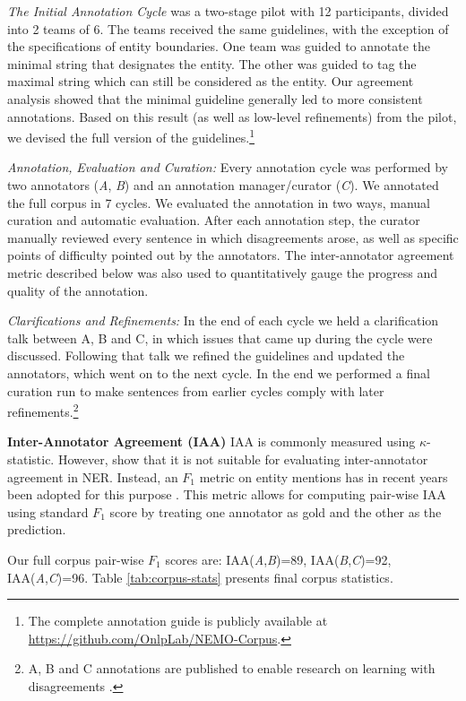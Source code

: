 \documentclass[11pt,a4paper]{article}
\begin{document}
{\em The Initial Annotation Cycle} was  a two-stage pilot with 12 participants, divided into 2 teams of 6. 
The teams received the same guidelines, with the exception of the specifications of entity boundaries. One team was guided to annotate the minimal string that designates the entity. The other was guided to tag the maximal string which can still be considered as the entity. Our agreement analysis showed that the minimal guideline generally led to more consistent annotations.
Based on this result (as well as low-level refinements) from the pilot,  we devised the  full version of the guidelines.\footnote{The complete annotation guide is publicly available at \scriptsize{\url{https://github.com/OnlpLab/NEMO-Corpus}}.} 

{\em Annotation,} {\em Evaluation and Curation:} 
Every annotation cycle was performed by two annotators (\emph{A}, \emph{B}) and an annotation manager/curator (\emph{C}). We annotated the full corpus in 7 cycles.
 We evaluated the annotation  in two ways, manual curation and automatic evaluation.
After each annotation step, the curator manually reviewed every sentence in which disagreements arose, as well as specific points of difficulty pointed out by the annotators. The inter-annotator agreement metric described  below was also used to quantitatively gauge the progress and quality of the annotation.

{\em Clarifications and Refinements:} In the end of each cycle we held a clarification talk between A, B and C, 
in which issues that came up during the cycle were discussed.
Following that talk we refined the guidelines and updated the annotators, which went on to the next cycle. 
In the end we performed a final curation run to make sentences from earlier cycles comply with later refinements.\footnote{A, B and C annotations are published to enable research on learning with disagreements \cite{plank-etal-2014-learning}.}

{\bf Inter-Annotator Agreement (IAA)}
\label{subsec:iaa}
IAA is commonly measured using  $\kappa$-statistic. However, \citet{pyysalo2007bioinfer} show that it is not suitable for evaluating inter-annotator agreement in NER. Instead, an $F_1$ metric on entity mentions has  in recent years been adopted for this purpose \cite{zhang2013named}. 
This metric allows for computing pair-wise IAA using standard $F_1$ score
by treating one annotator as gold and the other as the prediction.

Our full corpus pair-wise \(F_1\) scores are: IAA(\emph{A},\emph{B})=89, IAA(\emph{B},\emph{C})=92, IAA(\emph{A},\emph{C})=96. Table \ref{tab:corpus-stats} presents final corpus statistics.
\end{document}

